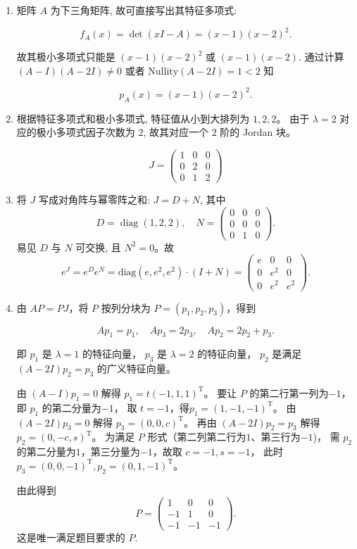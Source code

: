 \begin{enumerate}
\def\labelenumi{\arabic{enumi}.}

\item
  矩阵 \(A\) 为下三角矩阵, 故可直接写出其特征多项式:

\[f_{A} (x) = \det (x I - A) = (x - 1) (x - 2)^{2}.\]

故其极小多项式只能是 \((x-1)(x-2)^{2}\) 或 \((x-1)(x-2)\). 
通过计算 \((A-I)(A-2I)\neq0\) 或者 \(\mathrm{Nullity} (A-2I)=1<2\) 知

\[p_{A} (x) = (x - 1) (x - 2)^{2}.\]

\item
  根据特征多项式和极小多项式, 特征值从小到大排列为 $1, 2, 2$。
  由于 \(\lambda = 2\) 对应的极小多项式因子次数为 $2$, 
  故其对应一个 $2$ 阶的 Jordan 块。

\[J = \begin{pmatrix} 1 & 0 & 0 \\ 0 & 2 & 0 \\ 0 & 1 & 2 \end{pmatrix}\]

\item
  将 \(J\) 写成对角阵与幂零阵之和: \(J = D + N\), 其中
  \[D = \operatorname{diag}(1, 2, 2), \quad 
  N = \begin{pmatrix} 0 & 0 & 0 \\ 0 & 0 & 0 \\ 0 & 1 & 0 \end{pmatrix}.\]
  易见 \(D\) 与 \(N\) 可交换, 且 \(N^2 = 0\)。故
\[e^{J} = e^{D} e^{N} = \mathrm{diag} (e, e^{2}, e^{2}) \cdot (I + N) 
= \begin{pmatrix} e & 0 & 0 \\ 0 & e^{2} & 0 \\ 0 & e^{2} & e^{2} \end{pmatrix}.\]

\item
  由 \(AP = PJ\)，将 \(P\) 按列分块为 \(P = (p_1, p_2, p_3)\)，得到

\[A p_{1} = p_{1}, \quad A p_{3} = 2 p_{3}, \quad A p_{2} = 2 p_{2} + p_{3}.\]

即 \(p_1\) 是 \(\lambda = 1\) 的特征向量， \(p_3\) 是 \(\lambda = 2\)
的特征向量， \(p_2\) 是满足 \((A - 2I)p_2 = p_3\) 的广义特征向量。

由 \((A-I)p_{1}=0\) 解得 \(p_1=t(-1,1,1)^{\mathrm{T}}\)。
要让 \(P\) 的第二行第一列为$-1$，即 \(p_1\) 的第二分量为$-1$，
取 \(t=-1\)，得\(p_1=(1,-1,-1)^{\mathrm{T}}\)。
由 \((A-2I)p_{3}=0\) 解得 \(p_3=(0,0,c)^{\mathrm{T}}\)。
再由 \((A-2I)p_{2}=p_{3}\) 解得\(p_2=(0,-c,s)^{\mathrm{T}}\)。
为满足 \(P\) 形式（第二列第二行为$1$、第三行为$-1$)，
需 \(p_2\) 的第二分量为$1$，第三分量为$-1$，故取 \(c=-1,s=-1\)，
此时 \(p_3=(0,0,-1)^{\mathrm{T}},p_2=(0,1,-1)^{\mathrm{T}}\)。

由此得到
\[P = \begin{pmatrix} 1 & 0 & 0 \\ - 1 & 1 & 0 \\ - 1 & - 1 & - 1 \end{pmatrix}.\]
这是唯一满足题目要求的 $P$.
\end{enumerate}


